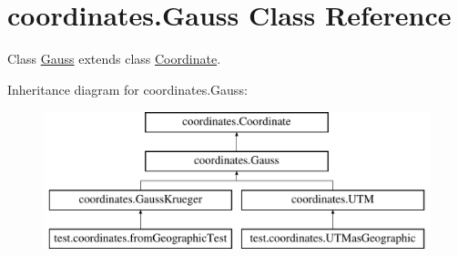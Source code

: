 \hypertarget{classcoordinates_1_1_gauss}{}\section{coordinates.\+Gauss Class Reference}
\label{classcoordinates_1_1_gauss}


Class \hyperlink{classcoordinates_1_1_gauss}{Gauss} extends class \hyperlink{classcoordinates_1_1_coordinate}{Coordinate}.  


Inheritance diagram for coordinates.\+Gauss\+:\begin{figure}[H]
\begin{center}
\leavevmode
\includegraphics[height=4.000000cm]{classcoordinates_1_1_gauss}
\end{center}
\end{figure}
